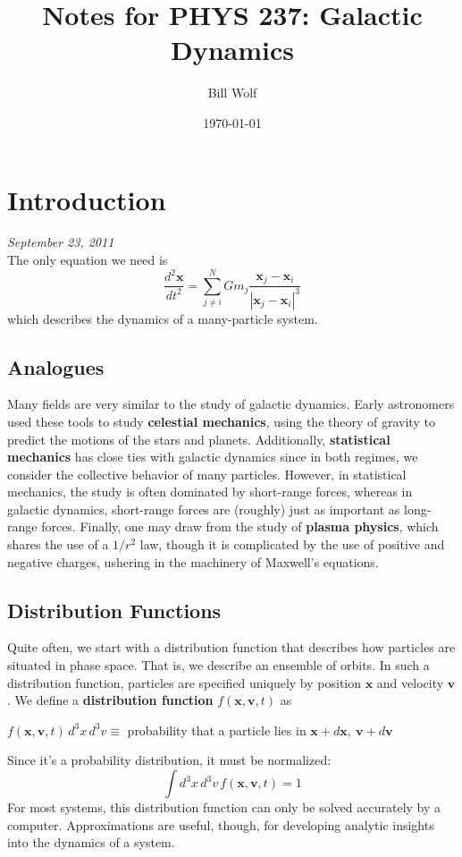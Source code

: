 \documentclass[10pt]{article}
\title{Notes for PHYS 237: Galactic Dynamics}
\author{Bill Wolf}
\date{\today}
\newcommand{\n}{\noindent}
\newcommand{\norm}[1]{\left|#1\right|}
\begin{document}
\vfill\maketitle\vfill \newpage

\tableofcontents \newpage


\section{Introduction}
	\emph{September 23, 2011}\\
	
	\n The only equation we need is 
	\begin{equation} \label{newton1} \frac{d^2\mathbf{x}}{dt^2}=\sum_{j\neq i}^N Gm_j\frac{\mathbf{x}_j-\mathbf{x}_i}{\norm{\mathbf{x}_j-\mathbf{x}_i}^3}\end{equation}
	which describes the dynamics of a many-particle system.
	\subsection{Analogues}
	Many fields are very similar to the study of galactic dynamics. Early astronomers used these tools to study \textbf{celestial mechanics}, using the theory of gravity to predict the motions of the stars and planets. Additionally, \textbf{statistical mechanics} has close ties with galactic dynamics since in both regimes, we consider the collective behavior of many particles. However, in statistical mechanics, the study is often dominated by short-range forces, whereas in galactic dynamics, short-range forces are (roughly) just as important as long-range forces. Finally, one may draw from the study of \textbf{plasma physics}, which shares the use of a $1/r^2$ law, though it is complicated by the use of positive and negative charges, ushering in the machinery of Maxwell's equations.
	\subsection{Distribution Functions}
	Quite often, we start with a distribution function that describes how particles are situated in phase space. That is, we describe an ensemble of orbits. In such a distribution function, particles are specified uniquely by position $\mathbf{x}$ and velocity $\mathbf{v}$. We define a \textbf{distribution function} $f(\mathbf{x},\mathbf{v},t)$ as
	\begin{center}
		$f(\mathbf{x},\mathbf{v},t)\,d^3x\,d^3v \equiv$ probability that a particle lies in $\mathbf{x}+d\mathbf{x},\ \mathbf{v}+d\mathbf{v}$
	\end{center}
	Since it's a probability distribution, it must be normalized:
	\begin{equation}\int d^3x\,d^3v\,f(\mathbf{x},\mathbf{v},t)=1\label{normalization1}\end{equation}
	For most systems, this distribution function can only be solved accurately by a computer. Approximations are useful, though, for developing analytic insights into the dynamics of a system.
\end{document}

